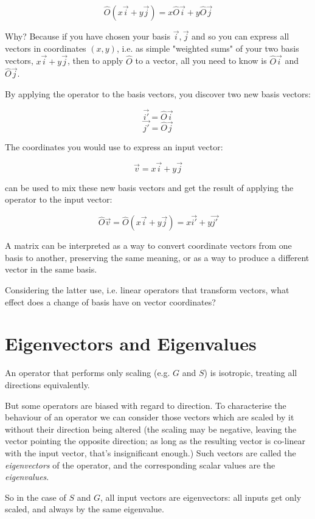 $$\hat{O}(x\vec{i} + y\vec{j}) = x\hat{O}\vec{i} + y\hat{O}\vec{j}$$

Why? Because if you have chosen your basis $\vec{i}, \vec{j}$ and so you can express all vectors in coordinates $(x, y)$, i.e. as simple "weighted sums" of your two basis vectors, $x\vec{i} + y\vec{j}$, then to apply $\hat{O}$ to a vector, all you need to know is $\hat{O}\vec{i}$ and $\hat{O}\vec{j}$.

By applying the operator to the basis vectors, you discover two new basis vectors:

$$\vec{i'} = \hat{O}\vec{i}$$
$$\vec{j'} = \hat{O}\vec{j}$$

The coordinates you would use to express an input vector:

$$\vec{v} = x\vec{i} + y\vec{j}$$

can be used to mix these new basis vectors and get the result of applying the operator to the input vector:

$$\hat{O}\vec{v} = \hat{O}(x\vec{i} + y\vec{j}) = x\vec{i'} + y\vec{j'}$$

A matrix can be interpreted as a way to convert coordinate vectors from one basis to another, preserving the same meaning, or as a way to produce a different vector in the same basis.

Considering the latter use, i.e. linear operators that transform vectors, what effect does a change of basis have on vector coordinates?

\section{Eigenvectors and Eigenvalues}\label{sec:vectors-eigen}

An operator that performs only scaling (e.g. $G$ and $S$) is isotropic, treating all directions equivalently.

But some operators are biased with regard to direction. To characterise the behaviour of an operator we can consider those vectors which are scaled by it without their direction being altered (the scaling may be negative, leaving the vector pointing the opposite direction; as long as the resulting vector is co-linear with the input vector, that's insignificant enough.) Such vectors are called the \textit{eigenvectors} of the operator, and the corresponding scalar values are the \textit{eigenvalues}.

So in the case of $S$ and $G$, all input vectors are eigenvectors: all inputs get only scaled, and always by the same eigenvalue.

